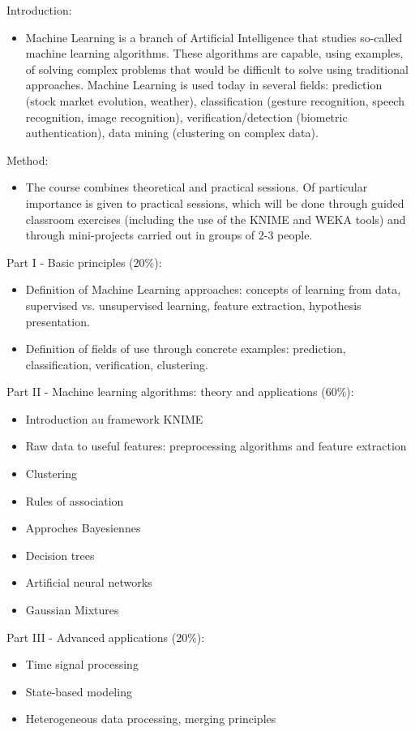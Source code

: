 Introduction:
\begin{itemize}
    \item Machine Learning is a branch of Artificial Intelligence that studies so-called machine learning algorithms. These algorithms are capable, using examples, of solving complex problems that would be difficult to solve using traditional approaches. Machine Learning is used today in several fields: prediction (stock market evolution, weather), classification (gesture recognition, speech recognition, image recognition), verification/detection (biometric authentication), data mining (clustering on complex data).
\end{itemize}
Method:
\begin{itemize}
    \item The course combines theoretical and practical sessions. Of particular importance is given to practical sessions, which will be done through guided classroom exercises (including the use of the KNIME and WEKA tools) and through mini-projects carried out in groups of 2-3 people.
\end{itemize}
Part I - Basic principles (20\%):
\begin{itemize}
    \item Definition of Machine Learning approaches: concepts of learning from data, supervised vs. unsupervised learning, feature extraction, hypothesis presentation.
    \item Definition of fields of use through concrete examples: prediction, classification, verification, clustering.
\end{itemize}
Part II - Machine learning algorithms: theory and applications (60\%):
\begin{itemize}
    \item Introduction au framework KNIME
    \item Raw data to useful features: preprocessing algorithms and feature extraction
    \item Clustering
    \item Rules of association
    \item Approches Bayesiennes
    \item Decision trees
    \item Artificial neural networks
    \item Gaussian Mixtures
\end{itemize}
\pagebreak
Part III - Advanced applications (20\%):
\begin{itemize}
    \item Time signal processing
    \item State-based modeling
    \item Heterogeneous data processing, merging principles
\end{itemize}